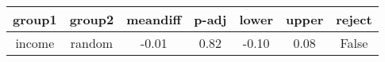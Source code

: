 \begin{tabular}{|c|c|c|c|c|c|c|}
\toprule
 group1 &  group2 &  meandiff &  p-adj &  lower &  upper &  reject \\
\midrule
 income &  random &     -0.01 &   0.82 &  -0.10 &   0.08 &   False \\
\bottomrule
\end{tabular}
